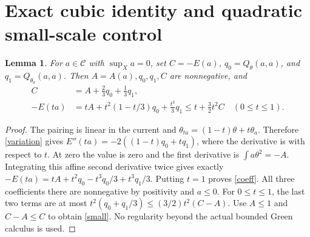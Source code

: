 \documentclass[11pt]{article}
\newtheorem{lemma}[theorem]{Lemma}
\newcommand{\C}{\mathcal C}
\begin{document}
\section{Exact cubic identity and quadratic small-scale control}
\begin{lemma}\label{scale}
For $a\in\C$ with $\sup_Xa=0$, set
$C=-E(a)$, $q_0=Q_\theta(a,a)$, and $q_1=Q_{\theta_a}(a,a)$.
Then $A=A(a),q_0,q_1,C$ are nonnegative, and
\begin{align}
 C&=A+\frac23q_0+\frac13q_1,\label{coeff}\\
 -E(ta)&=tA+t^2(1-t/3)q_0+\frac{t^3}{3}q_1
       \le t+\frac32t^2 C\quad(0\le t\le1).\label{small}
\end{align}
\end{lemma}
\begin{proof}
The pairing is linear in the current and
$\theta_{ta}=(1-t)\theta+t\theta_a$. Therefore
\eqref{variation} gives $E''(ta)=-2((1-t)q_0+tq_1)$,
where the derivative is with respect to $t$. At zero the value is zero
and the first derivative is $\int a\theta^2=-A$.
Integrating this affine second derivative twice gives exactly
$-E(ta)=tA+t^2q_0-t^3q_0/3+t^3q_1/3$.
Putting $t=1$ proves \eqref{coeff}. All three coefficients there
are nonnegative by positivity and $a\le0$.
For $0\le t\le1$, the last two terms are at most
$t^2(q_0+q_1/3)\le(3/2)t^2(C-A)$.
Use $A\le1$ and $C-A\le C$ to obtain \eqref{small}.
No regularity beyond the actual bounded Green calculus is used.
\end{proof}
\end{document}
